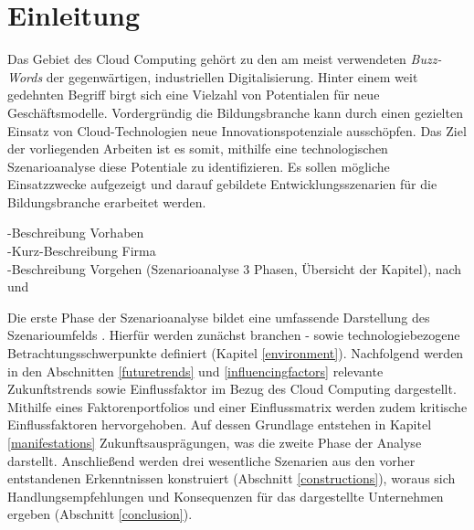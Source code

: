 \section{Einleitung}
\label{introduction}
Das Gebiet des Cloud Computing gehört zu den am meist verwendeten \textit{Buzz-Words} der gegenwärtigen, industriellen Digitalisierung.  Hinter einem weit gedehnten Begriff birgt sich eine Vielzahl von Potentialen für neue Geschäftsmodelle. Vordergründig die Bildungsbranche kann durch einen gezielten Einsatz von Cloud-Technologien neue Innovationspotenziale ausschöpfen.  Das Ziel der vorliegenden Arbeiten ist es somit, mithilfe eine technologischen Szenarioanalyse diese Potentiale zu identifizieren. Es sollen mögliche Einsatzzwecke aufgezeigt und darauf gebildete Entwicklungsszenarien für die Bildungsbranche erarbeitet werden.

-Beschreibung Vorhaben \\
-Kurz-Beschreibung Firma \\
-Beschreibung Vorgehen (Szenarioanalyse 3 Phasen, Übersicht der Kapitel), nach \cite{spath} und \cite{mietzner}
\todo[inline]{}

Die erste Phase der Szenarioanalyse bildet eine umfassende Darstellung des Szenarioumfelds  \cite{spath}. Hierfür werden zunächst branchen - sowie technologiebezogene Betrachtungsschwerpunkte definiert (Kapitel \ref{environment}). Nachfolgend werden in den Abschnitten \ref{futuretrends} und \ref{influencingfactors} relevante Zukunftstrends sowie Einflussfaktor im Bezug des Cloud Computing dargestellt. Mithilfe eines Faktorenportfolios und einer Einflussmatrix werden zudem kritische Einflussfaktoren hervorgehoben. Auf dessen Grundlage entstehen in Kapitel \ref{manifestations} Zukunftsausprägungen, was die zweite Phase der Analyse darstellt. Anschließend werden drei wesentliche Szenarien aus den vorher entstandenen Erkenntnissen konstruiert (Abschnitt \ref{constructions}), woraus sich Handlungsempfehlungen und Konsequenzen für das dargestellte Unternehmen ergeben (Abschnitt \ref{conclusion}).
